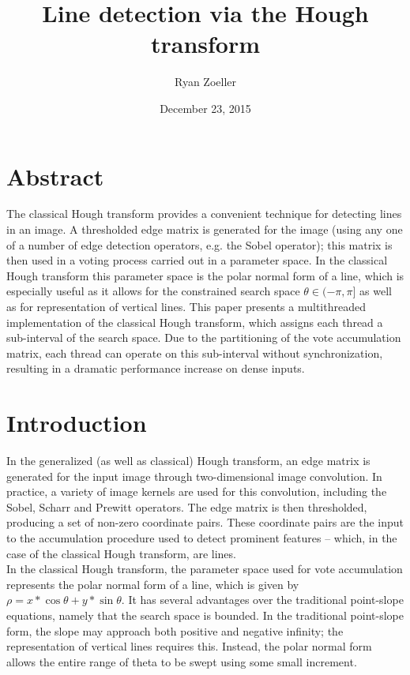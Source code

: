 \documentclass[letterpaper,12pt,titlepage]{article}
\title{Line detection via the Hough transform}
\date{December 23, 2015}
\author{Ryan Zoeller}
\begin{document}
\maketitle
\newpage

\section*{Abstract}
The classical Hough transform provides a convenient technique for detecting lines in an image.
A thresholded edge matrix is generated for the image (using any one of a number of edge detection
operators, e.g. the Sobel operator); this matrix is then used in a voting process carried
out in a parameter space. In the classical Hough transform this parameter space is the polar
normal form of a line, which is especially useful as it allows for the constrained
search space $\theta \in (-\pi,\pi]$ as well as for representation of vertical lines.
This paper presents a multithreaded implementation of the classical Hough transform, which assigns
each thread a sub-interval of the search space. Due to the partitioning of the vote accumulation
matrix, each thread can operate on this sub-interval without synchronization, resulting in a dramatic
performance increase on dense inputs.

\section{Introduction}
In the generalized (as well as classical) Hough transform, an edge matrix is generated
for the input image through two-dimensional image convolution. In practice, a variety of image
kernels are used for this convolution, including the Sobel, Scharr and Prewitt operators.
The edge matrix is then thresholded, producing a set of non-zero coordinate pairs.
These coordinate pairs are the input to the accumulation procedure used to detect prominent
features -- which, in the case of the classical Hough transform, are lines.
\\
In the classical Hough transform, the parameter space used for vote accumulation represents
the polar normal form of a line, which is given by $\rho=x*\cos{\theta}+y*\sin{\theta}$.
It has several advantages over the traditional point-slope equations, namely that the search
space is bounded. In the traditional point-slope form, the slope may approach both positive
and negative infinity; the representation of vertical lines requires this. Instead, the
polar normal form allows the entire range of theta to be swept using some small increment.
\end{document}
